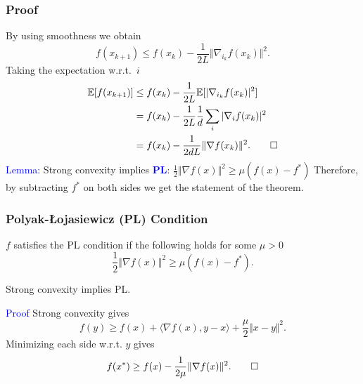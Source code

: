 \documentclass[aspectratio=149]{beamer}
\begin{document}
\begin{frame}
  \frametitle{Proof}
  By using smoothness we obtain
  \begin{equation}
    f(x_{k+1}) \le f(x_k) - \frac{1}{2L} \Vert \nabla_{i_k} f(x_k) \Vert^2.
  \end{equation}
  Taking the expectation w.r.t.\ $i$
  \begin{equation}
    \begin{aligned}
      \mathbb{E} [f(x_{k+1})] &\le f(x_k) - \frac{1}{2L} \mathbb{E}[\vert \nabla_{i_k} f(x_k) \vert^2] \\
      &= f(x_k) - \frac{1}{2L}\frac{1}{d} \sum_{i} \vert \nabla_i f(x_k) \vert^2 \\
      &= f(x_k) - \frac{1}{2 d L} \Vert \nabla f(x_k) \Vert^2.\qed
    \end{aligned}
  \end{equation}
  \textcolor{blue}{Lemma:} Strong convexity implies \textcolor{blue}{\textbf{PL}}: $\frac12 \Vert \nabla f(x) \Vert^2 \ge \mu (f(x)-f^*)$
  Therefore, by subtracting $f^*$ on both sides we get the statement of the theorem.
\end{frame}

\begin{frame}
  \frametitle{Polyak-{\L}ojasiewicz (PL) Condition}
  \begin{definition}
    $f$ satisfies the PL condition if the following holds for some $\mu>0$
    \begin{equation}
      \frac12 \Vert \nabla f(x) \Vert^2 \ge \mu (f(x)-f^*).
    \end{equation}
  \end{definition}

  \begin{lemma}%
    Strong convexity implies PL.
  \end{lemma}
  \textcolor{blue}{Proof}
    Strong convexity gives
    \begin{equation}
      f(y) \ge f(x) + \langle \nabla f(x), y-x \rangle + \frac{\mu}{2} \Vert x-y \Vert^2.
    \end{equation}
    Minimizing each side w.r.t. $y$ gives
    \begin{equation}
      f(x^*) \ge f(x) - \frac{1}{2 \mu} \Vert \nabla f(x) \Vert^2. \qed
    \end{equation}
\end{frame}
\end{document}
